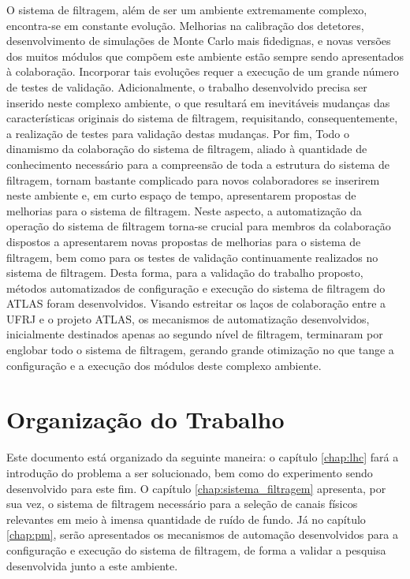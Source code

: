 O sistema de filtragem, além de ser um ambiente extremamente complexo, encontra-se em constante evolução. Melhorias na calibração dos detetores, desenvolvimento de simulações de Monte Carlo mais fidedignas, e novas versões dos muitos módulos que compõem este ambiente estão sempre sendo apresentados à colaboração. Incorporar tais evoluções requer a execução de um grande número de testes de validação. Adicionalmente, o trabalho desenvolvido precisa ser inserido neste complexo ambiente, o que resultará em inevitáveis mudanças das características originais do sistema de filtragem, requisitando, consequentemente, a realização de testes para validação destas mudanças. Por fim, Todo o dinamismo da colaboração do sistema de filtragem, aliado à quantidade de conhecimento necessário para a compreensão de toda a estrutura do sistema de filtragem,  tornam bastante complicado para novos colaboradores se inserirem neste ambiente e, em curto espaço de tempo, apresentarem propostas de melhorias para o sistema de filtragem. Neste aspecto, a automatização da operação do sistema de filtragem torna-se crucial para membros da colaboração dispostos a apresentarem novas propostas de melhorias para o sistema de filtragem, bem como para os testes de validação continuamente realizados no sistema de filtragem. Desta forma, para a validação do trabalho proposto, métodos automatizados de configuração e execução do sistema de filtragem do ATLAS foram desenvolvidos. Visando estreitar os laços de colaboração entre a UFRJ e o projeto ATLAS, os mecanismos de automatização desenvolvidos, inicialmente destinados apenas ao segundo nível de filtragem, terminaram por englobar todo o sistema de filtragem, gerando grande otimização no que tange a configuração e a execução dos módulos deste complexo ambiente. 



\section{Organização do Trabalho}

Este documento está organizado da seguinte maneira: o capítulo \ref{chap:lhc} fará a introdução do problema a ser solucionado, bem como do experimento sendo desenvolvido para este fim. O capítulo \ref{chap:sistema_filtragem} apresenta, por sua vez, o sistema de filtragem necessário para a seleção de canais físicos relevantes em meio à imensa quantidade de ruído de fundo. Já no capítulo \ref{chap:pm}, serão apresentados os mecanismos de automação desenvolvidos para a configuração e execução do sistema de filtragem, de forma a validar a pesquisa desenvolvida junto a este ambiente. 